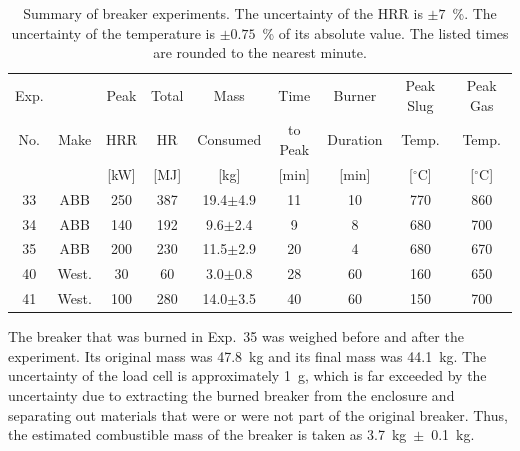\begin{table}[ht]
\begin{center}
\caption[Summary of Breaker Experiments]{Summary of breaker experiments. The uncertainty of the HRR is $\pm 7$~\%. The uncertainty of the temperature is $\pm 0.75$~\% of its absolute value. The listed times are rounded to the nearest minute.}
\label{matrix}
\begin{tabular}{|c|c|c|c|c|c|c|c|c|}
\hline
Exp.   &                & Peak          & Total   & Mass            & Time            & Burner       & Peak Slug    & Peak Gas      \\
No.    & Make           & HRR           & HR      & Consumed        & to Peak         & Duration     & Temp.        & Temp.         \\
       &                & [kW]          & [MJ]    & [kg]            & [min]           & [min]        & [$^\circ$C]  & [$^\circ$C]   \\ \hline
33     & ABB            & 250           & 387     & 19.4$\pm$4.9    & 11              & 10           & 770          & 860           \\ \hline
34     & ABB            & 140           & 192     & 9.6$\pm$2.4     & 9               & 8            & 680          & 700           \\ \hline
35     & ABB            & 200           & 230     & 11.5$\pm$2.9    & 20              & 4            & 680          & 670           \\ \hline
40     & West.          & 30            & 60      & 3.0$\pm$0.8     & 28              & 60           & 160          & 650           \\ \hline
41     & West.          & 100           & 280     & 14.0$\pm$3.5    & 40              & 60           & 150          & 700           \\ \hline
\end{tabular}
\end{center}
\end{table}

The breaker that was burned in Exp.~35 was weighed before and after the experiment. Its original mass was 47.8~kg and its final mass was 44.1~kg. The uncertainty of the load cell is approximately 1~g, which is far exceeded by the uncertainty due to extracting the burned breaker from the enclosure and separating out materials that were or were not part of the original breaker. Thus, the estimated combustible mass of the breaker is taken as 3.7~kg~$\pm$~0.1~kg.

